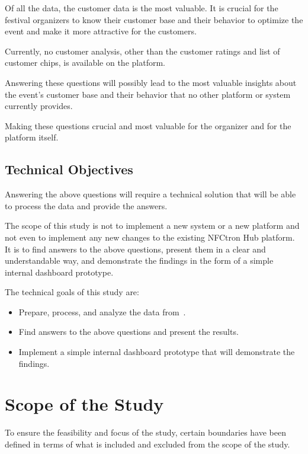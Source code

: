 Of all the data, the customer data is the most valuable.
It is crucial for the festival organizers to know their customer base and their behavior to optimize the event and make it more attractive for the customers.

Currently, no customer analysis, other than the customer ratings and list of customer chips, is available on the platform.

Answering these questions will possibly lead to the most valuable insights about the event's customer base and their behavior that no other platform or system currently provides.

Making these questions crucial and most valuable for the organizer and for the platform itself.

\subsection*{Technical Objectives}
\label{subsec:introduction-objectives-technical}
Answering the above questions will require a technical solution that will be able to process the data and provide the answers.

The scope of this study is not to implement a new system or a new platform and not even to implement any new changes to the existing NFCtron Hub platform.
It is to find answers to the above questions, present them in a clear and understandable way, and demonstrate the findings in the form of a simple internal dashboard prototype.

The technical goals of this study are:
\begin{itemize}
	\item Prepare, process, and analyze the data from~\theEvent.
	\item Find answers to the above questions and present the results.
	\item Implement a simple internal dashboard prototype that will demonstrate the findings.
\end{itemize}

\section*{Scope of the Study}
\label{sec:introduction-scope}
To ensure the feasibility and focus of the study, certain boundaries have been defined in terms of what is included and excluded from the scope of the study.

